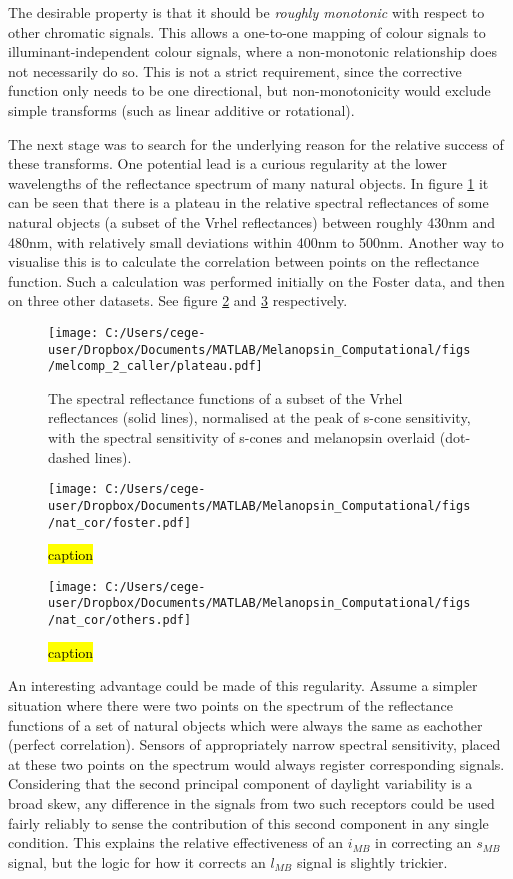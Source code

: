 The desirable property is that it should be \emph{roughly monotonic} with respect to other chromatic signals. This allows a one-to-one mapping of colour signals to illuminant-independent colour signals, where a non-monotonic relationship does not necessarily do so. This is not a strict requirement, since the corrective function only needs to be one directional, but non-monotonicity would exclude simple transforms (such as linear additive or rotational).

The next stage was to search for the underlying reason for the relative success of these transforms. One potential lead is a curious regularity at the lower wavelengths of the reflectance spectrum of many natural objects. In figure \ref{fig:plateau} it can be seen that there is a plateau in the relative spectral reflectances of some natural objects (a subset of the Vrhel reflectances) between roughly 430nm and 480nm, with relatively small deviations within 400nm to 500nm. Another way to visualise this is to calculate the correlation between points on the reflectance function. Such a calculation was performed initially on the Foster data, and then on three other datasets. See figure \ref{fig:foster} and \ref{fig:others} respectively.

\begin{figure}[h]
    \centering
    \texttt{[image: C:/Users/cege-user/Dropbox/Documents/MATLAB/Melanopsin\_Computational/figs/melcomp\_2\_caller/plateau.pdf]}
    \caption{The spectral reflectance functions of a subset of the Vrhel reflectances (solid lines), normalised at the peak of s-cone sensitivity, with the spectral sensitivity of s-cones and melanopsin overlaid (dot-dashed lines).}
    \label{fig:plateau}
\end{figure} 

\begin{figure}[h]
    \centering
    \texttt{[image: C:/Users/cege-user/Dropbox/Documents/MATLAB/Melanopsin\_Computational/figs/nat\_cor/foster.pdf]}
    \caption{\hl{caption}}
    \label{fig:foster}
\end{figure} 

\begin{figure}[h]
    \centering
    \texttt{[image: C:/Users/cege-user/Dropbox/Documents/MATLAB/Melanopsin\_Computational/figs/nat\_cor/others.pdf]}
    \caption{\hl{caption}}
    \label{fig:others}
\end{figure} 

An interesting advantage could be made of this regularity. Assume a simpler situation where there were two points on the spectrum of the reflectance functions of a set of natural objects which were always the same as eachother (perfect correlation). Sensors of appropriately narrow spectral sensitivity, placed at these two points on the spectrum would always register corresponding signals. Considering that the second principal component of daylight variability is a broad skew, any difference in the signals from two such receptors could be used fairly reliably to sense the contribution of this second component in any single condition. This explains the relative effectiveness of an $i_{MB}$ in correcting an $s_{MB}$ signal, but the logic for how it corrects an $l_{MB}$ signal is slightly trickier.

